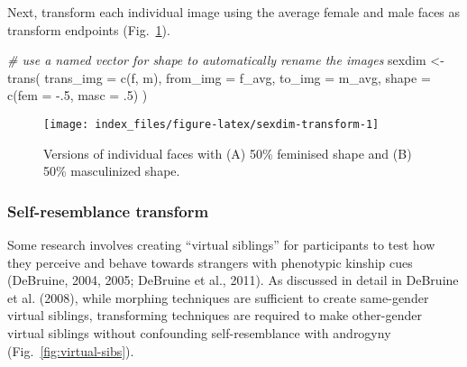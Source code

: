 \documentclass[
  doc,floatsintext]{apa6}
\newenvironment{Shaded}{\begin{snugshade}}{\end{snugshade}}
\newcommand{\AttributeTok}[1]{\textcolor[rgb]{0.77,0.63,0.00}{#1}}
\newcommand{\CommentTok}[1]{\textcolor[rgb]{0.56,0.35,0.01}{\textit{#1}}}
\newcommand{\DecValTok}[1]{\textcolor[rgb]{0.00,0.00,0.81}{#1}}
\newcommand{\FunctionTok}[1]{\textcolor[rgb]{0.00,0.00,0.00}{#1}}
\newcommand{\NormalTok}[1]{#1}
\newcommand{\OtherTok}[1]{\textcolor[rgb]{0.56,0.35,0.01}{#1}}
\newcommand{\SpecialCharTok}[1]{\textcolor[rgb]{0.00,0.00,0.00}{#1}}
\begin{document}
Next, transform each individual image using the average female and male faces as transform endpoints (Fig.~\ref{fig:sexdim-transform}).

\begin{Shaded}
\begin{Highlighting}[]
\CommentTok{\# use a named vector for shape to automatically rename the images}
\NormalTok{sexdim }\OtherTok{\textless{}{-}} \FunctionTok{trans}\NormalTok{(}
  \AttributeTok{trans\_img =} \FunctionTok{c}\NormalTok{(f, m),}
  \AttributeTok{from\_img =}\NormalTok{ f\_avg,}
  \AttributeTok{to\_img =}\NormalTok{ m\_avg,}
  \AttributeTok{shape =} \FunctionTok{c}\NormalTok{(}\AttributeTok{fem =} \SpecialCharTok{{-}}\NormalTok{.}\DecValTok{5}\NormalTok{, }\AttributeTok{masc =}\NormalTok{ .}\DecValTok{5}\NormalTok{)}
\NormalTok{)}
\end{Highlighting}
\end{Shaded}



\begin{figure}
\texttt{[image: index\_files/figure-latex/sexdim-transform-1]} \caption{Versions of individual faces with (A) 50\% feminised shape and (B) 50\% masculinized shape.}\label{fig:sexdim-transform}
\end{figure}

\hypertarget{self-resemblance-transform}{%
\subsubsection{Self-resemblance transform}\label{self-resemblance-transform}}

Some research involves creating ``virtual siblings'' for participants to test how they perceive and behave towards strangers with phenotypic kinship cues (DeBruine, 2004, 2005; DeBruine et al., 2011). As discussed in detail in DeBruine et al. (2008), while morphing techniques are sufficient to create same-gender virtual siblings, transforming techniques are required to make other-gender virtual siblings without confounding self-resemblance with androgyny (Fig.~\ref{fig:virtual-sibs}).
\end{document}
